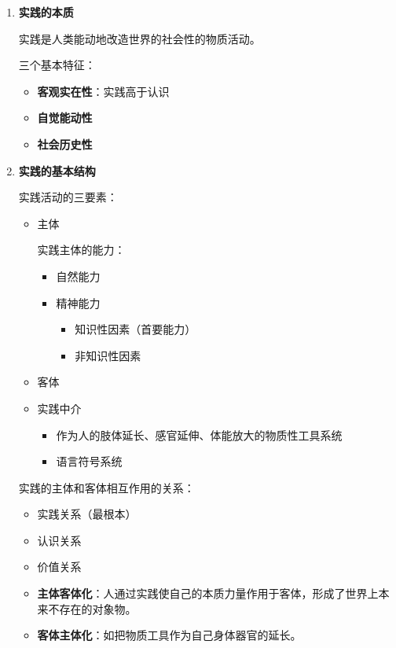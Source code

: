 \documentclass[12pt, a4paper, oneside]{ctexart}
\begin{document}
\begin{enumerate}
  \item {\bf 实践的本质}
  
  实践是人类能动地改造世界的社会性的物质活动。

  三个基本特征：
  \begin{itemize}
    \item {\bf 客观实在性}：实践高于认识
    \item {\bf 自觉能动性}
    \item {\bf 社会历史性}
  \end{itemize}

  \item {\bf 实践的基本结构}
  
  实践活动的三要素：
  \begin{itemize}
    \item 主体
    
    实践主体的能力：
    \begin{itemize}
      \item 自然能力
      \item 精神能力
      \begin{itemize}
        \item 知识性因素（首要能力）
        \item 非知识性因素
      \end{itemize}
    \end{itemize}
    \item 客体
    \item 实践中介
    \begin{itemize}
      \item 作为人的肢体延长、感官延伸、体能放大的物质性工具系统
      \item 语言符号系统
    \end{itemize}
  \end{itemize}

  实践的主体和客体相互作用的关系：
  \begin{itemize}
    \item 实践关系（最根本）
    \item 认识关系
    \item 价值关系
  \end{itemize}

  \begin{itemize}
    \item {\bf 主体客体化}：人通过实践使自己的本质力量作用于客体，形成了世界上本来不存在的对象物。
    \item {\bf 客体主体化}：如把物质工具作为自己身体器官的延长。
  \end{itemize}


\end{enumerate}
\end{document}
